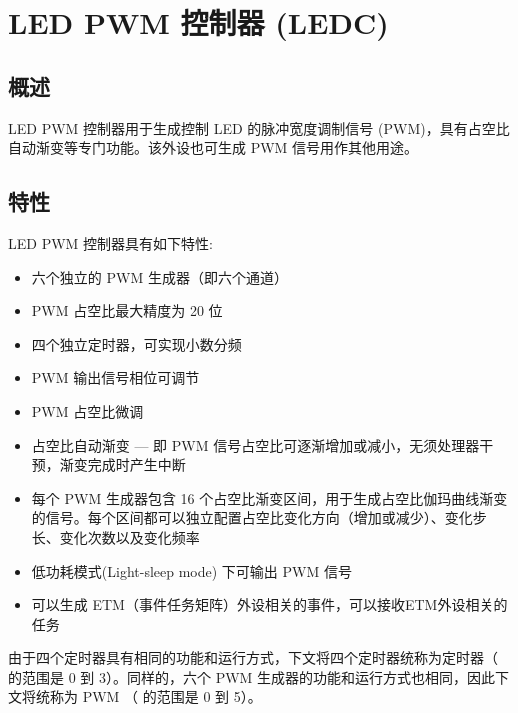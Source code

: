 \documentclass[main\_\_CN.tex]{subfiles}
\begin{document}

\ifglobal
\else
    {\let\clearpage\relax \listoftodos}
    {\let\clearpage\relax \listofdonetodos}
    \tableofcontents
\fi




\hypertarget{ledpwm}{}
\chapter{LED PWM 控制器 (LEDC)}
\label{mod:ledpwm}


\section{概述}

LED PWM 控制器用于生成控制 LED 的脉冲宽度调制信号 (PWM)，具有占空比自动渐变等专门功能。该外设也可生成 PWM 信号用作其他用途。

\section{特性}
LED PWM 控制器具有如下特性:
\begin{itemize}
    \item 六个独立的 PWM 生成器（即六个通道）
    \item PWM 占空比最大精度为 20 位
    \item 四个独立定时器，可实现小数分频
    \item PWM 输出信号相位可调节
    \item PWM 占空比微调
    \item 占空比自动渐变 — 即 PWM 信号占空比可逐渐增加或减小，无须处理器干预，渐变完成时产生中断
    \item 每个 PWM 生成器包含 16 个占空比渐变区间，用于生成占空比伽玛曲线渐变的信号。每个区间都可以独立配置占空比变化方向（增加或减少）、变化步长、变化次数以及变化频率
    \item 低功耗模式(Light-sleep mode) 下可输出 PWM 信号
    \item 可以生成 ETM（事件任务矩阵）外设相关的事件，可以接收ETM外设相关的任务
\end{itemize}

由于四个定时器具有相同的功能和运行方式，下文将四个定时器统称为定时器（ 的范围是 0 到 3）。同样的，六个 PWM 生成器的功能和运行方式也相同，因此下文将统称为 PWM （ 的范围是 0 到 5）。
\end{document}
